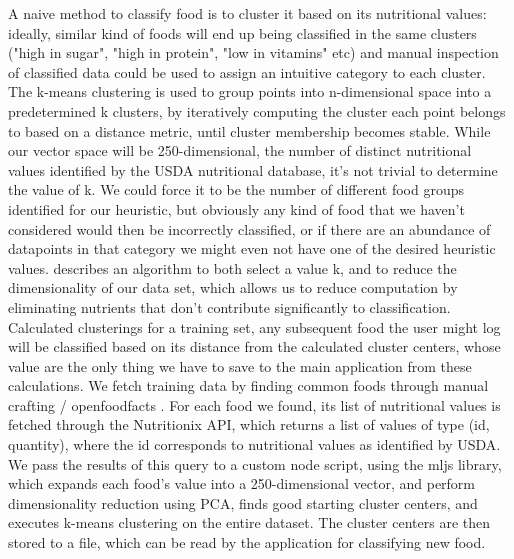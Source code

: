 \documentclass{article}
\begin{document}
A naive method to classify food is to cluster it based on its nutritional values: ideally, similar kind of foods will end up being classified in the same clusters ("high in sugar", "high in protein", "low in vitamins" etc) and manual inspection of classified data could be used to assign an intuitive category to each cluster.
The k-means clustering is used to group points into n-dimensional space into a predetermined k clusters, by iteratively computing the cluster each point belongs to based on a distance metric, until cluster membership becomes stable. While our vector space will be 250-dimensional, the number of distinct nutritional values identified by the USDA nutritional database, it's not trivial to determine the value of k. We could force it to be the number of different food groups identified for our heuristic, but obviously any kind of food that we haven't considered would then be incorrectly classified, or if there are an abundance of datapoints in that category we might even not have one of the desired heuristic values. \cite{Napoleon, 2011} describes an algorithm to both select a value k, and to reduce the dimensionality of our data set, which allows us to reduce computation by eliminating nutrients that don't contribute significantly to classification.
Calculated clusterings for a training set, any subsequent food the user might log will be classified based on its distance from the calculated cluster centers, whose value are the only thing we have to save to the main application from these calculations.
We fetch training data by finding common foods through { manual crafting / openfoodfacts }. For each food we found, its list of nutritional values is fetched through the Nutritionix API, which returns a list of values of type (id, quantity), where the id corresponds to nutritional values as identified by USDA. We pass the results of this query to a custom node script, using the mljs library, which expands each food's value into a 250-dimensional vector, and perform dimensionality reduction using PCA, finds good starting cluster centers, and executes k-means clustering on the entire dataset. The cluster centers are then stored to a file, which can be read by the application for classifying new food.
\end{document}
